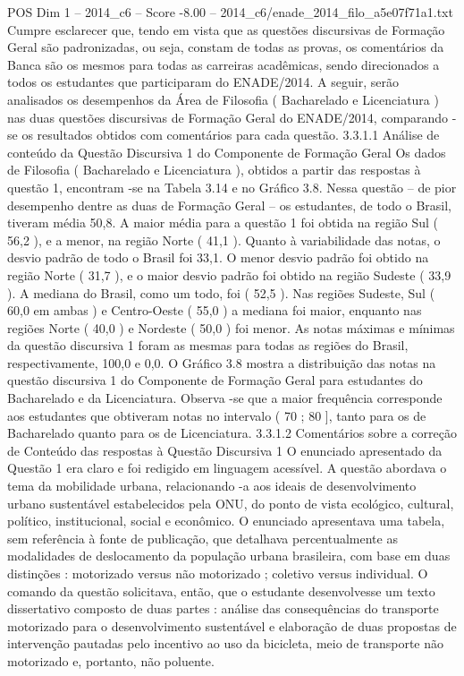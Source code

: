 \begin{textsample}{POS Dim 1 – 2014\_c6 – Score -8.00 – 2014\_c6/enade\_2014\_filo\_a5e07f71a1.txt}
Cumpre esclarecer que, tendo em vista que as questões discursivas de Formação Geral são padronizadas, ou seja, constam de todas as provas, os comentários da Banca são os mesmos para todas as carreiras acadêmicas, sendo direcionados a todos os estudantes que participaram do ENADE/2014.
A seguir, serão analisados os desempenhos da Área de Filosofia ( Bacharelado e Licenciatura ) nas duas questões discursivas de Formação Geral do ENADE/2014, comparando -se os resultados obtidos com comentários para cada questão. 3.3.1.1 Análise de conteúdo da Questão Discursiva 1 do Componente de Formação Geral Os dados de Filosofia ( Bacharelado e Licenciatura ), obtidos a partir das respostas à questão 1, encontram -se na Tabela 3.14 e no Gráfico 3.8.
Nessa questão – de pior desempenho dentre as duas de Formação Geral – os estudantes, de todo o Brasil, tiveram média 50,8.
A maior média para a questão 1 foi obtida na região Sul ( 56,2 ), e a menor, na região Norte ( 41,1 ).
Quanto à variabilidade das notas, o desvio padrão de todo o Brasil foi 33,1.
O menor desvio padrão foi obtido na região Norte ( 31,7 ), e o maior desvio padrão foi obtido na região Sudeste ( 33,9 ).
A mediana do Brasil, como um todo, foi ( 52,5 ).
Nas regiões Sudeste, Sul ( 60,0 em ambas ) e Centro-Oeste ( 55,0 ) a mediana foi maior, enquanto nas regiões Norte ( 40,0 ) e Nordeste ( 50,0 ) foi menor.
As notas máximas e mínimas da questão discursiva 1 foram as mesmas para todas as regiões do Brasil, respectivamente, 100,0 e 0,0.
O Gráfico 3.8 mostra a distribuição das notas na questão discursiva 1 do Componente de Formação Geral para estudantes do Bacharelado e da Licenciatura.
Observa -se que a maior frequência corresponde aos estudantes que obtiveram notas no intervalo ( 70 ; 80 ], tanto para os de Bacharelado quanto para os de Licenciatura. 3.3.1.2 Comentários sobre a correção de Conteúdo das respostas à Questão Discursiva 1 O enunciado apresentado da Questão 1 era claro e foi redigido em linguagem acessível.
A questão abordava o tema da mobilidade urbana, relacionando -a aos ideais de desenvolvimento urbano sustentável estabelecidos pela ONU, do ponto de vista ecológico, cultural, político, institucional, social e econômico.
O enunciado apresentava uma tabela, sem referência à fonte de publicação, que detalhava percentualmente as modalidades de deslocamento da população urbana brasileira, com base em duas distinções : motorizado versus não motorizado ; coletivo versus individual.
O comando da questão solicitava, então, que o estudante desenvolvesse um texto dissertativo composto de duas partes : análise das consequências do transporte motorizado para o desenvolvimento sustentável e elaboração de duas propostas de intervenção pautadas pelo incentivo ao uso da bicicleta, meio de transporte não motorizado e, portanto, não poluente.

\end{textsample}
